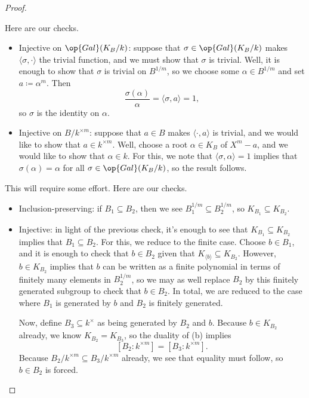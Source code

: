 \documentclass[notes.tex]{subfiles}
\begin{document}
\begin{proof}
\begin{listalph}
		Here are our checks.
		\begin{itemize}
			\item Injective on $\op{Gal}(K_B/k)$: suppose that $\sigma\in\op{Gal}(K_B/k)$ makes $\langle\sigma,\cdot\rangle$ the trivial function, and we must show that $\sigma$ is trivial. Well, it is enough to show that $\sigma$ is trivial on $B^{1/m}$, so we choose some $\alpha\in B^{1/m}$ and set $a\coloneqq\alpha^m$. Then
			\[\frac{\sigma(\alpha)}{\alpha}=\langle\sigma,a\rangle=1,\]
			so $\sigma$ is the identity on $\alpha$.
			\item Injective on $B/k^{\times m}$: suppose that $a\in B$ makes $\langle\cdot,a\rangle$ is trivial, and we would like to show that $a\in k^{\times m}$. Well, choose a root $\alpha\in K_B$ of $X^m-a$, and we would like to show that $\alpha\in k$. For this, we note that $\langle\sigma,\alpha\rangle=1$ implies that $\sigma(\alpha)=\alpha$ for all $\sigma\in\op{Gal}(K_B/k)$, so the result follows.
		\end{itemize}
		\item This will require some effort. Here are our checks.
		\begin{itemize}
			\item Inclusion-preserving: if $B_1\subseteq B_2$, then we see $B_1^{1/m}\subseteq B_2^{1/m}$, so $K_{B_1}\subseteq K_{B_2}$.

			\item Injective: in light of the previous check, it's enough to see that $K_{B_1}\subseteq K_{B_2}$ implies that $B_1\subseteq B_2$. For this, we reduce to the finite case. Choose $b\in B_1$, and it is enough to check that $b\in B_2$ given that $K_{\langle b\rangle}\subseteq K_{B_2}$. However, $b\in K_{B_2}$ implies that $b$ can be written as a finite polynomial in terms of finitely many elements in $B_2^{1/m}$, so we may as well replace $B_2$ by this finitely generated subgroup to check that $b\in B_2$. In total, we are reduced to the case where $B_1$ is generated by $b$ and $B_2$ is finitely generated.

			Now, define $B_3\subseteq k^\times$ as being generated by $B_2$ and $b$. Because $b\in K_{B_2}$ already, we know $K_{B_2}=K_{B_3}$, so the duality of (b) implies
			\[[B_2:k^{\times m}]=[B_3:k^{\times m}].\]
			Because $B_2/k^{\times m}\subseteq B_3/k^{\times m}$ already, we see that equality must follow, so $b\in B_2$ is forced.


\end{itemize}
\end{listalph}
\end{proof}
\end{document}
